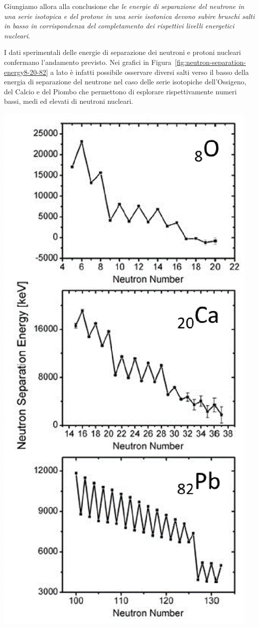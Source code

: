 Giungiamo allora alla conclusione che \emph{le energie di separazione del neutrone in una serie isotopica e del protone in una serie isotonica devono subire bruschi salti in basso in corrispondenza del completamento dei rispettivi livelli energetici nucleari}.
\bigskip

I dati sperimentali delle energie di separazione dei neutroni e protoni nucleari confermano l’andamento previsto.
Nei grafici in Figura~\ref{fig:neutron-separation-energy8-20-82} a lato è infatti possibile osservare diversi salti verso il basso della energia di
separazione del neutrone nel caso delle serie isotopiche dell’Ossigeno, del Calcio e del Piombo che permettono di esplorare
rispettivamente numeri bassi, medi ed elevati di neutroni nucleari.
\begin{marginfigure}
	\includegraphics{figs/neutron-separation-energy8-20-82}

\end{marginfigure}
